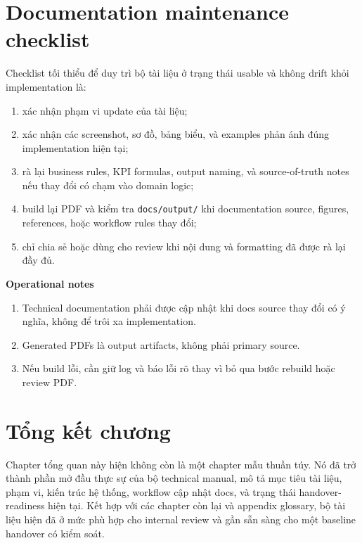 \section{Documentation maintenance checklist}

Checklist tối thiểu để duy trì bộ tài liệu ở trạng thái usable và không drift khỏi implementation là:

\begin{enumerate}[label=-]
\item xác nhận phạm vi update của tài liệu;
\item xác nhận các screenshot, sơ đồ, bảng biểu, và examples phản ánh đúng implementation hiện tại;
\item rà lại business rules, KPI formulas, output naming, và source-of-truth notes nếu thay đổi có chạm vào domain logic;
\item build lại PDF và kiểm tra \texttt{docs/output/} khi documentation source, figures, references, hoặc workflow rules thay đổi;
\item chỉ chia sẻ hoặc dùng cho review khi nội dung và formatting đã được rà lại đầy đủ.
\end{enumerate}

\noindent\textbf{Operational notes}

\begin{enumerate}[label=-]
\item Technical documentation phải được cập nhật khi docs source thay đổi có ý nghĩa, không để trôi xa implementation.
\item Generated PDFs là output artifacts, không phải primary source.
\item Nếu build lỗi, cần giữ log và báo lỗi rõ thay vì bỏ qua bước rebuild hoặc review PDF.
\end{enumerate}

\section{Tổng kết chương}

Chapter tổng quan này hiện không còn là một chapter mẫu thuần túy. Nó đã trở thành phần mở đầu thực sự của bộ technical manual, mô tả mục tiêu tài liệu, phạm vi, kiến trúc hệ thống, workflow cập nhật docs, và trạng thái handover-readiness hiện tại. Kết hợp với các chapter còn lại và appendix glossary, bộ tài liệu hiện đã ở mức phù hợp cho internal review và gần sẵn sàng cho một baseline handover có kiểm soát.
